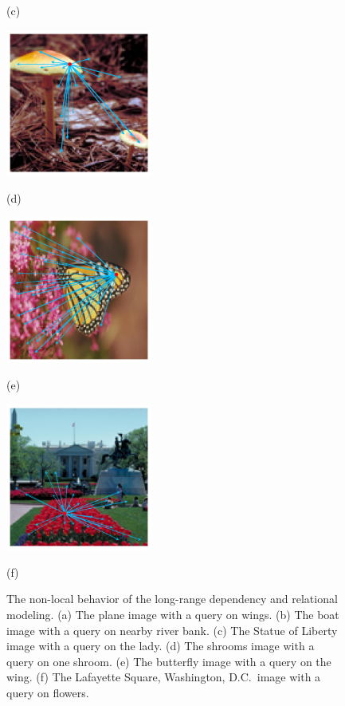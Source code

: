 \begin{figure}[ht]
\begin{minipage}[t]{.32\linewidth}
			\centerline{(c)}
		\end{minipage}
		\begin{minipage}[t]{.32\linewidth}
			\includegraphics[width=1.9in]{fig/shroom_superpixel.jpg}
			\centerline{(d)}
		\end{minipage}
		\begin{minipage}[t]{.32\linewidth}
			\includegraphics[width=1.9in]{fig/monarch_superpixel.jpg}
			\centerline{(e)}
		\end{minipage}
		\begin{minipage}[t]{.32\linewidth}
			\includegraphics[width=1.9in]{fig/flower_superpixel.jpg}
			\centerline{(f)}
		\end{minipage}
		\caption{The non-local behavior of the long-range dependency and relational modeling. (a) The plane image with a query on wings. (b) The boat image with a query on nearby river bank. (c) The Statue of Liberty image with a query on the lady. (d) The shrooms image with a query on one shroom. (e) The butterfly image with a query on the wing. (f) The Lafayette Square, Washington, D.C.~image with a query on flowers.}
		\label{Non-local Behavior from the TID2013 database}
	\end{figure}
